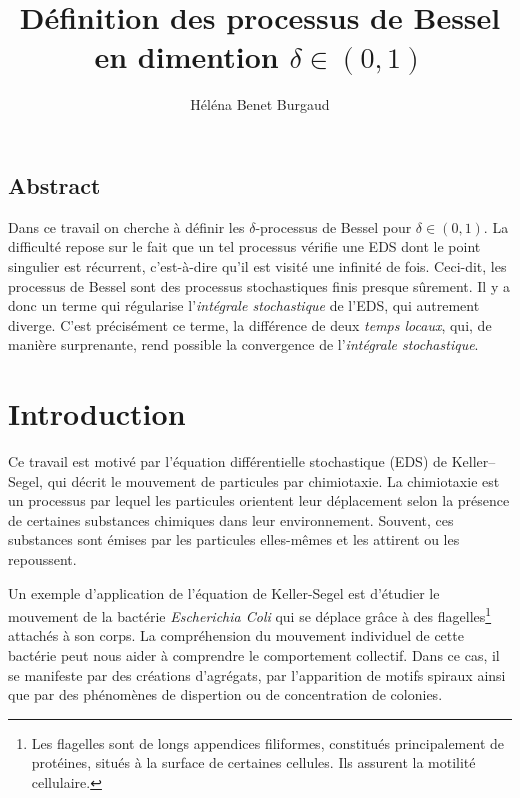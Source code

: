 \documentclass[openany]{book}
\title{Définition des processus de Bessel en dimention $\delta \in (0,1)$}
\author{Héléna Benet Burgaud}
\newcommand{\1}{\mathbbm{1}}
\theoremstyle{thmfont}
\theoremstyle{deffont}
\theoremstyle{thmfont}
\theoremstyle{deffont}
\begin{document}

\maketitle
\tableofcontents
\clearpage
{} %
\setcounter{page}{1}


{\let\clearpage\relax
  
  \section*{Abstract}
  Dans ce travail on cherche à définir les $\delta$-processus de Bessel pour $\delta \in (0,1)$. La difficulté repose sur le fait que un tel processus vérifie une EDS dont le point singulier est récurrent, c'est-à-dire qu'il est visité une infinité de fois. Ceci-dit, les processus de Bessel sont des processus stochastiques finis presque sûrement. Il y a donc un terme qui régularise l'\textit{intégrale stochastique} de l'EDS, qui autrement diverge. C’est précisément ce terme, la différence de deux \textit{temps locaux}, qui, de manière surprenante, rend possible la convergence de l’\textit{intégrale stochastique}.
  
\chapter*{Introduction}

Ce travail est motivé par l’équation différentielle stochastique (EDS) de Keller--Segel, qui décrit le mouvement de particules par chimiotaxie. La chimiotaxie est un processus par lequel les particules orientent leur déplacement selon la présence de certaines substances chimiques dans leur environnement. Souvent, ces substances sont émises par les particules elles-mêmes et les attirent ou les repoussent.

Un exemple d'application de l'équation de Keller-Segel est d'étudier le mouvement de la bactérie \textit{Escherichia Coli} qui se déplace grâce à des flagelles\footnote{Les flagelles sont de longs appendices filiformes, constitués principalement de protéines, situés à la surface de certaines cellules. Ils assurent la motilité cellulaire.} attachés à son corps. La compréhension du mouvement individuel de cette bactérie peut nous aider à comprendre le comportement collectif. Dans ce cas, il se manifeste par des créations d'agrégats, par l'apparition de motifs spiraux ainsi que par des phénomènes de dispertion ou de concentration de colonies.

}
\end{document}
